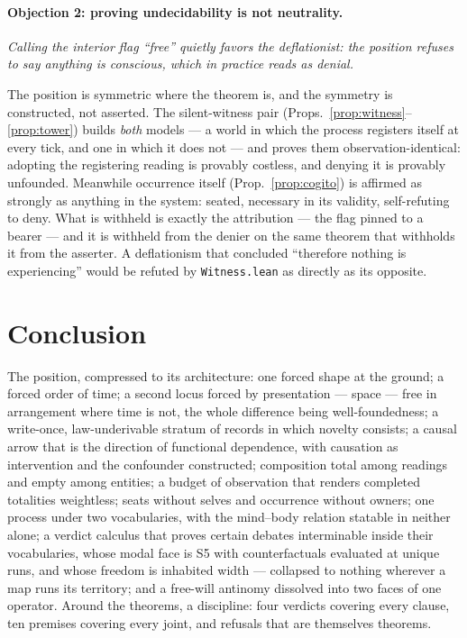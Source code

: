 \documentclass[11pt]{article}
\theoremstyle{remark}
\newcommand{\lf}[1]{\texttt{#1}}       %
\begin{document}
\paragraph{Objection 2: proving undecidability is not neutrality.} \emph{Calling the interior flag ``free'' quietly favors the deflationist: the position refuses to say anything is conscious, which in practice reads as denial.}

The position is symmetric where the theorem is, and the symmetry is constructed, not asserted. The silent-witness pair (Props.~\ref{prop:witness}--\ref{prop:tower}) builds \emph{both} models --- a world in which the process registers itself at every tick, and one in which it does not --- and proves them observation-identical: adopting the registering reading is provably costless, and denying it is provably unfounded. Meanwhile occurrence itself (Prop.~\ref{prop:cogito}) is affirmed as strongly as anything in the system: seated, necessary in its validity, self-refuting to deny. What is withheld is exactly the attribution --- the flag pinned to a bearer --- and it is withheld from the denier on the same theorem that withholds it from the asserter. A deflationism that concluded ``therefore nothing is experiencing'' would be refuted by \lf{Witness.lean} as directly as its opposite.

\section{Conclusion}

The position, compressed to its architecture: one forced shape at the ground; a forced order of time; a second locus forced by presentation --- space --- free in arrangement where time is not, the whole difference being well-foundedness; a write-once, law-underivable stratum of records in which novelty consists; a causal arrow that is the direction of functional dependence, with causation as intervention and the confounder constructed; composition total among readings and empty among entities; a budget of observation that renders completed totalities weightless; seats without selves and occurrence without owners; one process under two vocabularies, with the mind--body relation statable in neither alone; a verdict calculus that proves certain debates interminable inside their vocabularies, whose modal face is S5 with counterfactuals evaluated at unique runs, and whose freedom is inhabited width --- collapsed to nothing wherever a map runs its territory; and a free-will antinomy dissolved into two faces of one operator. Around the theorems, a discipline: four verdicts covering every clause, ten premises covering every joint, and refusals that are themselves theorems.
\end{document}
